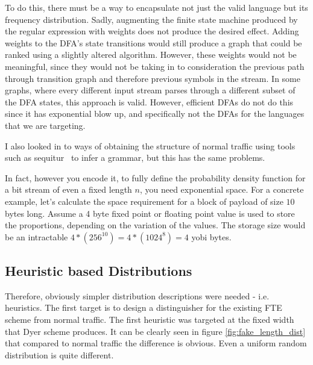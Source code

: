 \documentclass[ %
                    author={Samuel Russell},
                supervisor={Prof. Bogdan Warinschi},
                    degree={MEng},
                     title={Innocuous Ciphertexts},
                  subtitle={The DE-CENSOR Scheme},
                      type={research},
                      year={2018} ]{dissertation}
\begin{document}
To do this, there must be a way to encapsulate not just the valid language but its frequency distribution.
Sadly, augmenting the finite state machine produced by the regular expression with weights does not produce the desired effect.
Adding weights to the DFA's state transitions would still produce a graph that could be ranked using a slightly altered algorithm.
However, these weights would not be meaningful, since they would not be taking in to consideration the previous path through transition graph and therefore previous symbols in the stream.
In some graphs, where every different input stream parses through a different subset of the DFA states, this approach is valid.
However, efficient DFAs do not do this since it has exponential blow up, and specifically not the DFAs for the languages that we are targeting.

I also looked in to ways of obtaining the structure of normal traffic using tools such as sequitur~\cite{sequitur} to infer a grammar, but this has the same problems. 

In fact, however you encode it, to fully define the probability density function for a bit stream of even a fixed length $n$, you need exponential space.
For a concrete example, let's calculate the space requirement for a block of payload of size $10$ bytes long.
Assume a 4 byte fixed point or floating point value is used to store the proportions, depending on the variation of the values.
The storage size would be an intractable $4*(256^10) = 4*(1024^8) = 4$ yobi bytes.

\subsection{Heuristic based Distributions}

Therefore, obviously simpler distribution descriptions were needed - i.e. heuristics.
The first target is to design a distinguisher for the existing FTE scheme from normal traffic.
The first heuristic was targeted at the fixed width that Dyer scheme produces.
It can be clearly seen in figure \ref{fig:fake_length_dist} that compared to normal traffic the difference is obvious.
Even a uniform random distribution is quite different.
\end{document}
